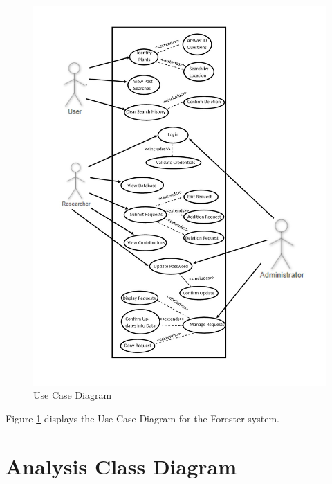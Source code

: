 \documentclass[]{article}
\begin{document}
    \begin{figure}[!hb]
      \includegraphics[width=\linewidth]{usecase.jpg}
      \caption{Use Case Diagram}
      \label{fig:UCD}
    \end{figure}
    
    Figure \ref{fig:UCD} displays the Use Case Diagram for the Forester system.

\clearpage

\section{Analysis Class Diagram}
\label{sec:analysis_class_diagram}
\end{document}
